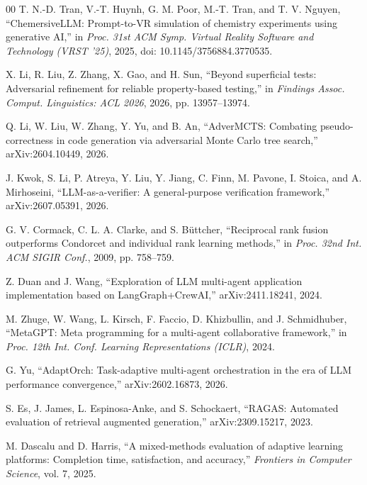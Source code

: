 \documentclass[conference]{IEEEtran}
\begin{document}
\begin{thebibliography}{00}
 T. N.-D. Tran, V.-T. Huynh, G. M. Poor, M.-T. Tran, and T. V. Nguyen, ``ChemersiveLLM: Prompt-to-VR simulation of chemistry experiments using generative AI,'' in \emph{Proc. 31st ACM Symp. Virtual Reality Software and Technology (VRST '25)}, 2025, doi: 10.1145/3756884.3770535.

 X. Li, R. Liu, Z. Zhang, X. Gao, and H. Sun, ``Beyond superficial tests: Adversarial refinement for reliable property-based testing,'' in \emph{Findings Assoc. Comput. Linguistics: ACL 2026}, 2026, pp. 13957--13974.

 Q. Li, W. Liu, W. Zhang, Y. Yu, and B. An, ``AdverMCTS: Combating pseudo-correctness in code generation via adversarial Monte Carlo tree search,'' arXiv:2604.10449, 2026.

 J. Kwok, S. Li, P. Atreya, Y. Liu, Y. Jiang, C. Finn, M. Pavone, I. Stoica, and A. Mirhoseini, ``LLM-as-a-verifier: A general-purpose verification framework,'' arXiv:2607.05391, 2026.

 G. V. Cormack, C. L. A. Clarke, and S. B\"uttcher, ``Reciprocal rank fusion outperforms Condorcet and individual rank learning methods,'' in \emph{Proc. 32nd Int. ACM SIGIR Conf.}, 2009, pp. 758--759.

 Z. Duan and J. Wang, ``Exploration of LLM multi-agent application implementation based on LangGraph+CrewAI,'' arXiv:2411.18241, 2024.

 M. Zhuge, W. Wang, L. Kirsch, F. Faccio, D. Khizbullin, and J. Schmidhuber, ``MetaGPT: Meta programming for a multi-agent collaborative framework,'' in \emph{Proc. 12th Int. Conf. Learning Representations (ICLR)}, 2024.

 G. Yu, ``AdaptOrch: Task-adaptive multi-agent orchestration in the era of LLM performance convergence,'' arXiv:2602.16873, 2026.

 S. Es, J. James, L. Espinosa-Anke, and S. Schockaert, ``RAGAS: Automated evaluation of retrieval augmented generation,'' arXiv:2309.15217, 2023.

 M. Dascalu and D. Harris, ``A mixed-methods evaluation of adaptive learning platforms: Completion time, satisfaction, and accuracy,'' \emph{Frontiers in Computer Science}, vol. 7, 2025.

\end{thebibliography}
\end{document}
